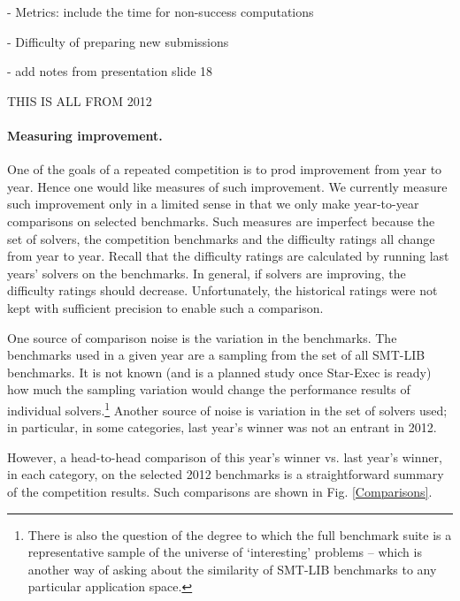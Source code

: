 \documentclass[twosize,11pt]{article}
\begin{document}
- Metrics: include the time for non-success computations

- Difficulty of preparing new submissions

- add notes from presentation slide 18

THIS IS ALL FROM 2012

\paragraph{Measuring improvement.}


One of the goals of a repeated competition is to prod improvement from year to year. Hence one would like measures of such improvement. We currently measure such improvement only in a limited sense in that we only make year-to-year comparisons on selected benchmarks. Such measures are imperfect because the set of solvers, the competition benchmarks and the difficulty ratings all change from year to year. Recall that the difficulty ratings are calculated by running last years' solvers on the benchmarks. In general, if solvers are improving, the difficulty ratings should decrease. Unfortunately, the historical ratings were not kept with sufficient precision to enable such a comparison. 

One source of comparison noise is the variation in the benchmarks. The benchmarks used in a given year are a sampling from the set of all SMT-LIB benchmarks. It is not known (and is a planned study once Star-Exec is ready) how much the sampling variation would change the performance results of individual solvers.\footnote{There is also the question of the degree to which the full benchmark suite is a representative sample of the universe of `interesting' problems -- which is another way of asking about the similarity of SMT-LIB benchmarks to any particular application space.} Another source of noise is variation in the set of solvers used; in particular, in some categories, last year's winner was not an entrant in 2012.

However, a head-to-head comparison of this year's winner vs. last year's winner, in each category, on the selected 2012 benchmarks is a straightforward summary of the competition results. Such comparisons are shown in Fig. \ref{Comparisons}.
\end{document}
